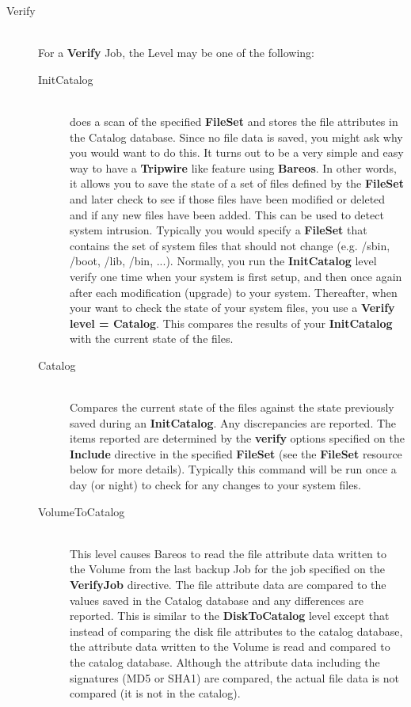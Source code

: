 {\begin{description}
    \item [Verify] \hfill \\
        For a {\bf Verify} Job, the Level may be one of the  following:

\begin{description}

\item [InitCatalog] \hfill \\
%
does a scan of the specified {\bf FileSet} and stores the file
attributes in the Catalog database.  Since no file data is saved, you
might ask why you would want to do this.  It turns out to be a very
simple and easy way to have a {\bf Tripwire} like feature using {\bf
Bareos}.  In other words, it allows you to save the state of a set of
files defined by the {\bf FileSet} and later check to see if those files
have been modified or deleted and if any new files have been added.
This can be used to detect system intrusion.  Typically you would
specify a {\bf FileSet} that contains the set of system files that
should not change (e.g.  /sbin, /boot, /lib, /bin, ...).  Normally, you
run the {\bf InitCatalog} level verify one time when your system is
first setup, and then once again after each modification (upgrade) to
your system.  Thereafter, when your want to check the state of your
system files, you use a {\bf Verify} {\bf level = Catalog}.  This
compares the results of your {\bf InitCatalog} with the current state of
the files.

\item [Catalog] \hfill \\
%
Compares the current state of the files against the state previously
saved during an {\bf InitCatalog}.  Any discrepancies are reported.  The
items reported are determined by the {\bf verify} options specified on
the {\bf Include} directive in the specified {\bf FileSet} (see the {\bf
FileSet} resource below for more details).  Typically this command will
be run once a day (or night) to check for any changes to your system
files.


\item [VolumeToCatalog] \hfill \\
%
This level causes Bareos to read the file attribute data written to the
Volume from the last backup Job for the job specified on the {\bf VerifyJob}
directive.  The file attribute data are compared to the
values saved in the Catalog database and any differences are reported.
This is similar to the {\bf DiskToCatalog} level except that instead of
comparing the disk file attributes to the catalog database, the
attribute data written to the Volume is read and compared to the catalog
database.  Although the attribute data including the signatures (MD5 or
SHA1) are compared, the actual file data is not compared (it is not in
the catalog).


\end{description}
\end{description}}
